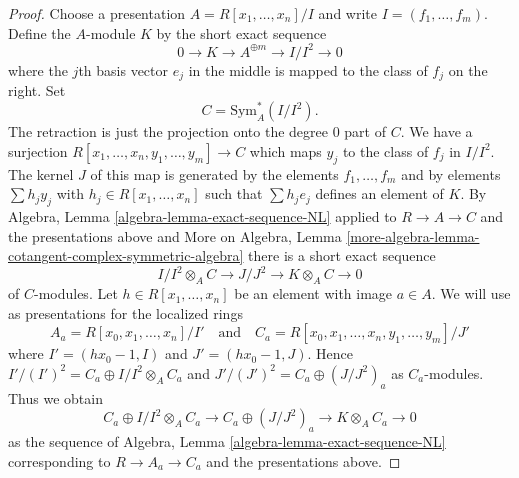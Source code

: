 \begin{proof}
Choose a presentation $A = R[x_1, \ldots, x_n]/I$ and write
$I = (f_1, \ldots, f_m)$. Define the $A$-module $K$ by the short exact sequence
$$
0 \to K \to A^{\oplus m} \to I/I^2 \to 0
$$
where the $j$th basis vector $e_j$ in the middle is mapped to the class of
$f_j$ on the right. Set
$$
C = \text{Sym}^*_A(I/I^2).
$$
The retraction is just the projection onto the degree $0$ part of $C$.
We have a surjection $R[x_1, \ldots, x_n, y_1, \ldots, y_m] \to C$
which maps $y_j$ to the class of $f_j$ in $I/I^2$. The kernel $J$ of this
map is generated by the elements $f_1, \ldots, f_m$ and by elements
$\sum h_j y_j$ with $h_j \in R[x_1, \ldots, x_n]$ such that
$\sum h_j e_j$ defines an element of $K$. By
Algebra, Lemma \ref{algebra-lemma-exact-sequence-NL}
applied to $R \to A \to C$ and the presentations above and
More on Algebra, Lemma
\ref{more-algebra-lemma-cotangent-complex-symmetric-algebra}
there is a short exact sequence
\begin{equation}
\label{equation-sequence}
I/I^2 \otimes_A C \to J/J^2 \to K \otimes_A C \to 0
\end{equation}
of $C$-modules. Let $h \in R[x_1, \ldots, x_n]$ be an element
with image $a \in A$. We will use as presentations for the localized rings
$$
A_a = R[x_0, x_1, \ldots, x_n]/I'
\quad\text{and}\quad
C_a = R[x_0, x_1, \ldots, x_n, y_1, \ldots, y_m]/J'
$$
where $I' = (hx_0 - 1, I)$ and $J' = (hx_0 - 1, J)$. Hence
$I'/(I')^2 = C_a \oplus I/I^2 \otimes_A C_a$ and
$J'/(J')^2 = C_a \oplus (J/J^2)_a$ as $C_a$-modules.
Thus we obtain
\begin{equation}
\label{equation-sequence-localized}
C_a \oplus I/I^2 \otimes_A C_a \to
C_a \oplus (J/J^2)_a \to
K \otimes_A C_a \to 0
\end{equation}
as the sequence of
Algebra, Lemma \ref{algebra-lemma-exact-sequence-NL}
corresponding to $R \to A_a \to C_a$ and the presentations above.


\end{proof}
